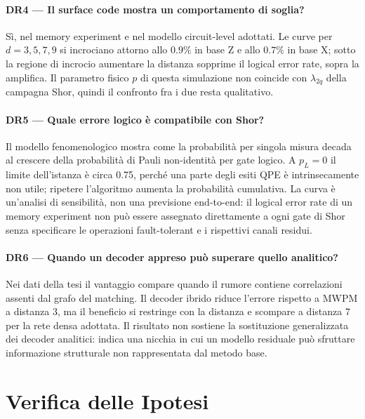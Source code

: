 \begin{onehalfspace}
\paragraph{DR4 --- Il surface code mostra un comportamento di soglia?}
Sì, nel memory experiment e nel modello circuit-level adottati. Le curve
per $d=3,5,7,9$ si incrociano attorno allo $0.9\%$ in base Z e allo
$0.7\%$ in base X; sotto la regione di incrocio aumentare la distanza
sopprime il logical error rate, sopra la amplifica. Il parametro fisico
$p$ di questa simulazione non coincide con $\lambda_{2q}$ della campagna
Shor, quindi il confronto fra i due resta qualitativo.

\paragraph{DR5 --- Quale errore logico è compatibile con Shor?}
Il modello fenomenologico mostra come la probabilità per singola misura
decada al crescere della probabilità di Pauli non-identità per gate
logico. A $p_L=0$ il limite dell'istanza è circa 0.75, perché una parte
degli esiti QPE è intrinsecamente non utile; ripetere l'algoritmo aumenta
la probabilità cumulativa. La curva è un'analisi di sensibilità, non una
previsione end-to-end: il logical error rate di un memory experiment non
può essere assegnato direttamente a ogni gate di Shor senza specificare
le operazioni fault-tolerant e i rispettivi canali residui.

\paragraph{DR6 --- Quando un decoder appreso può superare quello
analitico?}
Nei dati della tesi il vantaggio compare quando il rumore contiene
correlazioni assenti dal grafo del matching. Il decoder ibrido riduce
l'errore rispetto a \ac{MWPM} a distanza 3, ma il beneficio si restringe
con la distanza e scompare a distanza 7 per la rete densa adottata. Il
risultato non sostiene la sostituzione generalizzata dei decoder
analitici: indica una nicchia in cui un modello residuale può sfruttare
informazione strutturale non rappresentata dal metodo base.

\section{Verifica delle Ipotesi}
\label{sec:verifica_ipotesi}


\end{onehalfspace}

